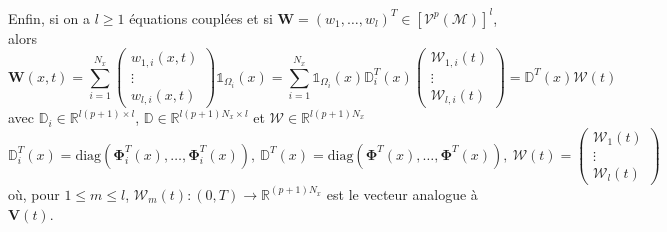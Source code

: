 \documentclass[11pt, a4paper, oneside]{report}
\begin{document}
\begin{samepage}
Enfin, si on a $l \geq 1$ équations couplées et si $\bm{W} = (w_1, \dots, w_l)^T \in [\mathcal{V}^p(\mathcal{M})]^l$, alors
\begin{equation} \label{eq:Projection_vecteur_d_etat}
    \bm{W}(x, t) = \sum_{i = 1}^{N_x} \begin{pmatrix} w_{1, i}(x, t) \\ \vdots \\ w_{l, i}(x, t) \end{pmatrix} \mathds{1}_{\Omega_i}(x) = \sum_{i = 1}^{N_x} \mathds{1}_{\Omega_i}(x) \mathbb{D}_i^T(x) \begin{pmatrix} \bm{\mathcal{W}}_{1, i}(t) \\ \vdots \\ \bm{\mathcal{W}}_{l, i}(t) \end{pmatrix} = \mathbb{D}^T(x) \bm{\mathcal{W}}(t)
\end{equation}
avec $\mathbb{D}_i \in \mathbb{R}^{l(p+1) \times l}$, $\mathbb{D} \in \mathbb{R}^{l(p+1)N_x \times l}$ et $\bm{\mathcal{W}} \in \mathbb{R}^{l(p+1)N_x}$
\begin{equation} \label{eq:Construction_globale_vecteur_d_etat}
    \mathbb{D}_i^T(x) = \text{diag}(\bm{\Phi}_i^T(x), \dots, \bm{\Phi}_i^T(x)), ~ \mathbb{D}^T(x) = \text{diag}(\bm{\Phi}^T(x), \dots, \bm{\Phi}^T(x)), ~ 
    \bm{\mathcal{W}}(t) = \begin{pmatrix} \bm{\mathcal{W}}_1(t) \\ \vdots \\ \bm{\mathcal{W}}_l(t)
    \end{pmatrix}
\end{equation}
où, pour $1 \leq m \leq l$, $\bm{\mathcal{W}}_m(t) : (0, T) \longrightarrow \mathbb{R}^{(p+1)N_x}$ est le vecteur analogue à $\bm{V}(t)$.
\end{samepage}
\end{document}
